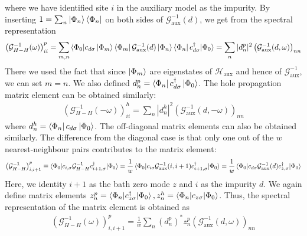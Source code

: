 \documentclass{report}
\numberwithin{equation}{section}
\begin{document}
where we have identified site \(i\) in the auxiliary model as the impurity.
By inserting \(1 = \sum_n \ket{\Phi_n}\bra{\Phi_n}\) on both sides of \(\mathcal{G}^{-1}_\text{aux}(d)\), we get from the spectral representation
\begin{equation}\begin{aligned}
	\left(\mathcal{G}^{-1}_{H-H}(\omega)\right)^p_{ii} = \sum_{m,n} \braket{\Phi_0 | c_{d\sigma} \ket{\Phi_m}\bra{\Phi_m}\mathcal{G}^{-1}_\text{aux}(d) \ket{\Phi_n}\bra{\Phi_n} c^\dagger_{d\sigma} | \Phi_0} = \sum_{n} |d^p_n|^2 \left(\mathcal{G}^{-1}_\text{aux}(d, \omega)\right)_{nn} 
\end{aligned}\end{equation}
There we used the fact that since \(\ket{\Phi_m}\) are eigenstates of \(\mathcal{H}_\text{aux}\) and hence of \(\mathcal{G}^{-1}_\text{aux}\), we can set \(m=n\). We also defined \(d^p_n = \bra{\Phi_n}c^\dagger_{d\sigma}\ket{\Phi_0}\). The hole propagation matrix element can be obtained similarly:
\begin{equation}\begin{aligned}
	\left(\mathcal{G}^{-1}_{H-H}(-\omega)\right)^h_{ii} = \sum_{n} |d^h_n|^2 \left(\mathcal{G}^{-1}_\text{aux}(d, -\omega)\right)_{nn} 
\end{aligned}\end{equation}
where \(d^h_n = \bra{\Phi_n}c_{d\sigma}\ket{\Phi_0}\). The off-diagonal matrix elements can also be obtained similarly. The difference from the diagonal case is that only one out of the \(w\) nearest-neighbour pairs contributes to the matrix element:
\begin{equation}\begin{aligned}
	\left(\mathcal{G}^{-1}_{H-H}\right)^p_{i,i+1} \equiv \braket{\Phi_0 | c_{i,\sigma} \mathcal{G}^{-1}_{H-H} c^\dagger_{i+1,\sigma} | \Phi_0} = \frac{1}{w}\braket{\Phi_0 | c_{i\sigma} \mathcal{G}^{-1}_\text{aux}(i,i+1) c^\dagger_{i+1,\sigma} | \Phi_0} = \frac{1}{w}\braket{\Phi_0 | c_{d\sigma} \mathcal{G}^{-1}_\text{aux}(d) c^\dagger_{z,\sigma} | \Phi_0}
\end{aligned}\end{equation}
Here, we identity \(i+1\) as the bath zero mode \(z\) and \(i\) as the impurity \(d\). We again define matrix elements \(z_n^p = \braket{\Phi_n | c^\dagger_{z\sigma} | \Phi_0}, z_n^h = \braket{\Phi_n | c_{z\sigma} | \Phi_0}\). Thus, the spectral representation of the matrix element is obtained as
\begin{equation}\begin{aligned}
	\left(\mathcal{G}^{-1}_{H-H}\left(\omega\right) \right)^p_{i,i+1} = \frac{1}{w} \sum_n \left(d^p_n\right)^* z^p_n \left(\mathcal{G}^{-1}_\text{aux}(d, \omega) \right)_{nn}
\end{aligned}\end{equation}
\end{document}
